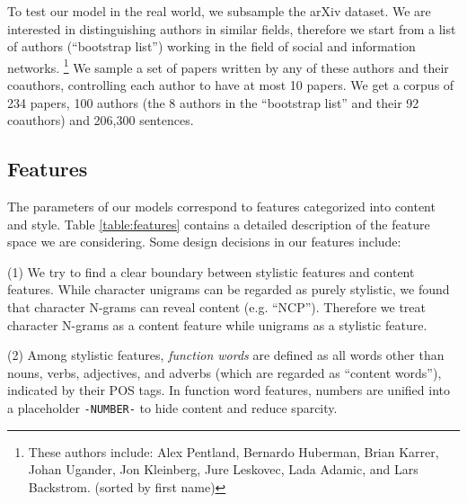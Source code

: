 To test our model in the real world, we subsample the arXiv dataset. We are interested in distinguishing authors in similar fields, therefore we start from a list of authors (``bootstrap list'') working in the field of social and information networks.
\footnote{These authors include: Alex Pentland, Bernardo Huberman, Brian Karrer, Johan Ugander, Jon Kleinberg, Jure Leskovec, Lada Adamic, and Lars Backstrom. (sorted by first name)} 
We sample a set of papers written by any of these authors and their coauthors, controlling each author to have at most 10 papers. We get a corpus of 234 papers, 100 authors (the 8 authors in the ``bootstrap list'' and their 92 coauthors) and 206,300 sentences.


\subsection{Features}\label{sec:features}

The parameters of our models correspond to features categorized into content and style. Table \ref{table:features} contains a detailed description of the feature space we are considering. Some design decisions in our features include:

(1) We try to find a clear boundary between stylistic features and content features. While character unigrams can be regarded as purely stylistic, we found that character N-grams can reveal content (e.g. ``NCP''). Therefore we treat character N-grams as a content feature while unigrams as a stylistic feature.

(2) Among stylistic features, \textit{function words} are defined as
all words other than nouns, verbs, adjectives, and adverbs (which are
regarded as ``content words''), indicated by their POS tags. In
function word features, numbers are unified into a placeholder
\texttt{-NUMBER-} to hide content and reduce sparcity.

